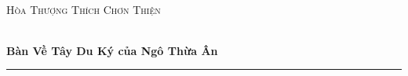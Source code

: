 \begin{titlepage}
\begin{center}
~\\
\textsc{Hòa Thượng Thích Chơn Thiện}
\vspace{3.5cm}

\HRule \\[0.5cm]
\textbf{\Huge{Bàn Về Tây Du Ký của Ngô Thừa Ân}}\\[0.5cm]
\rule{\linewidth}{0.5pt}\\[1cm]


\end{center}
\end{titlepage}
